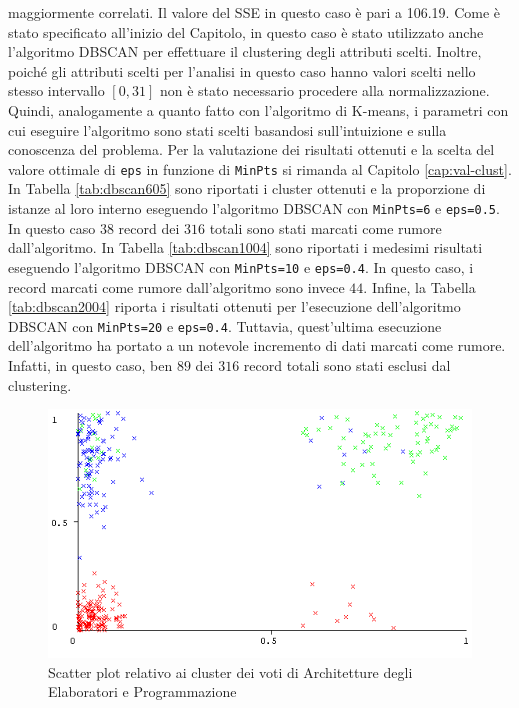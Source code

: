 \documentclass[12pt]{article}
\begin{document}
maggiormente correlati. Il valore del SSE in questo caso è pari a 106.19. Come è stato specificato all'inizio del Capitolo, in questo caso è stato utilizzato anche l'algoritmo DBSCAN per effettuare il clustering degli attributi scelti. Inoltre, poiché gli attributi scelti per l'analisi in questo caso hanno valori scelti nello stesso intervallo $[0,31]$ non è stato necessario procedere alla normalizzazione. Quindi, analogamente a quanto fatto con l'algoritmo di K-means, i parametri con cui eseguire l'algoritmo sono stati scelti basandosi sull'intuizione e sulla conoscenza del problema. Per la valutazione dei risultati ottenuti e la scelta del valore ottimale di \texttt{eps} in funzione di \texttt{MinPts} si rimanda al Capitolo \ref{cap:val-clust}. In Tabella \ref{tab:dbscan605} sono riportati i cluster ottenuti e la proporzione di istanze al loro interno eseguendo l'algoritmo DBSCAN con \texttt{MinPts=6} e \texttt{eps=0.5}. In questo caso $38$ record dei $316$ totali sono stati marcati come rumore dall'algoritmo. In Tabella \ref{tab:dbscan1004} sono riportati i medesimi risultati eseguendo l'algoritmo DBSCAN con \texttt{MinPts=10} e \texttt{eps=0.4}. In questo caso, i record marcati come rumore dall'algoritmo sono invece $44$. Infine, la Tabella \ref{tab:dbscan2004} riporta i risultati ottenuti per l'esecuzione dell'algoritmo DBSCAN con \texttt{MinPts=20} e \texttt{eps=0.4}. Tuttavia, quest'ultima esecuzione dell'algoritmo ha portato a un notevole incremento di dati marcati come rumore. Infatti, in questo caso, ben $89$ dei $316$ record totali sono stati esclusi dal clustering. 
\begin{figure}[H]
	\includegraphics[width=\textwidth]{img/ARC-PRG-Cluster.png}
	\captionsetup{justification=centering}
	\caption{Scatter plot relativo ai cluster dei voti di Architetture degli Elaboratori e Programmazione}
	\label{APC}
\end{figure}
\end{document}

